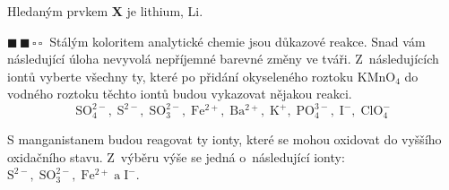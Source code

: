 \documentclass{book}
\newcommand{\dva}{$\blacksquare \, \blacksquare \, \square \, \square \; \; $}
\renewenvironment{quotation}{\par}{\par} %
\begin{document}
Hledaným prvkem \textbf{X} je lithium, Li.

\hrulefill %
\begin{quotation}
\dva Stálým koloritem analytické chemie jsou důkazové reakce. Snad vám
následující úloha nevyvolá nepříjemné barevné změny ve tváři. Z~následujících
iontů vyberte všechny ty, které po přidání okyseleného roztoku $\mathrm{KMnO_{4}}$
do vodného roztoku těchto iontů budou vykazovat nějakou reakci. 
\[
\mathrm{SO_{4}^{2-},\;S^{2-},\;SO_{3}^{2-},\;Fe^{2+},\;Ba^{2+},\;K^{+},\;PO_{4}^{3-},\;I^{-},\;ClO_{4}^{-}}
\]
\end{quotation} \dotfill \par 
S manganistanem budou reagovat ty ionty, které se mohou oxidovat do vyššího oxidačního stavu. Z~výběru výše se jedná o~následující ionty: $\mathrm{S^{2-},\;SO_{3}^{2-},\;Fe^{2+}\;a\;I^{-}}$.
\end{document}
